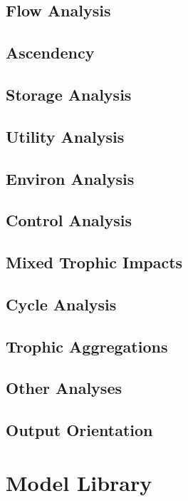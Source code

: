 \documentclass[12pt]{article}
\begin{document}
\subsection{Flow Analysis}

\subsection{Ascendency}

\subsection{Storage Analysis}

\subsection{Utility Analysis}

\subsection{Environ Analysis}

\subsection{Control Analysis}

\subsection{Mixed Trophic Impacts}

\subsection{Cycle Analysis}

\subsection{Trophic Aggregations}

\subsection{Other Analyses}

\subsection{Output Orientation}  

\section{Model Library}
\end{document}
